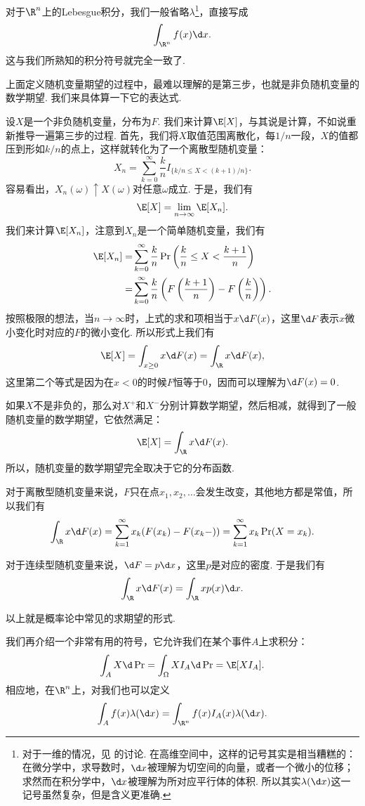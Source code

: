 对于$\R^n$上的Lebesgue积分，我们一般省略$\lambda$\footnote{对于一维的情况，见 的讨论. 在高维空间中，这样的记号其实是相当糟糕的：在微分学中，求导数时，$\d x$被理解为切空间的向量，或者一个微小的位移；求然而在积分学中，$\d x$被理解为所对应平行体的体积. 所以其实$\lambda(\d x)$这一记号虽然复杂，但是含义更准确. }，直接写成
\[\int_{\R^n} f(x)\d x.\]
这与我们所熟知的积分符号就完全一致了. 

上面定义随机变量期望的过程中，最难以理解的是第三步，也就是非负随机变量的数学期望. 我们来具体算一下它的表达式. 

设$X$是一个非负随机变量，分布为$F$. 我们来计算$\E[X]$，与其说是计算，不如说重新推导一遍第三步的过程. 首先，我们将$X$取值范围离散化，每$1/n$一段，$X$的值都压到形如$k/n$的点上，这样就转化为了一个离散型随机变量：
\[X_n=\sum_{k=0}^\infty\frac{k}{n}I_{\{k/n\leq X<(k+1)/n\}}.\]
容易看出，$X_n(\omega)\uparrow X(\omega)$对任意$\omega$成立. 于是，我们有
\[\E[X]=\lim_{n\to\infty}\E[X_n].\]
我们来计算$\E[X_n]$，注意到$X_n$是一个简单随机变量，我们有
\begin{align*}
    \E[X_n]=&\sum_{k=0}^\infty\frac{k}{n}\Pr\left(\frac{k}{n}\leq X<\frac{k+1}{n}\right)\\
    =&\sum_{k=0}^\infty\frac{k}{n}\left(F\left(\frac{k+1}{n}\right)-F\left(\frac{k}{n}\right)\right).
\end{align*}
按照极限的想法，当$n\to\infty$时，上式的求和项相当于$x\d F(x)$，这里$\d F$表示$x$微小变化时对应的$F$的微小变化. 所以形式上我们有
\[\E[X]=\int_{x\geq 0} x\d F(x)=\int_\R x\d F(x),\]
这里第二个等式是因为在$x<0$的时候$F$恒等于$0$，因而可以理解为$\d F(x)=0$.

如果$X$不是非负的，那么对$X^+$和$X^-$分别计算数学期望，然后相减，就得到了一般随机变量的数学期望，它依然满足：
\[\E[X]=\int_{\R} x\d F(x).\]
所以，随机变量的数学期望完全取决于它的分布函数. 

对于离散型随机变量来说，$F$只在点$x_1,x_2,\dots$会发生改变，其他地方都是常值，所以我们有
\[\int_{\R} x\d F(x)=\sum_{k=1}^\infty x_k(F(x_k)-F(x_k-))=\sum_{k=1}^\infty x_k\Pr(X=x_k).\]

对于连续型随机变量来说，$\d F=p\d x$，这里$p$是对应的密度. 于是我们有
\[\int_{\R} x\d F(x)=\int_{\R} x p(x)\d x.\]

以上就是概率论中常见的求期望的形式. 

我们再介绍一个非常有用的符号，它允许我们在某个事件$A$上求积分：
\[\int_A X\d\Pr=\int_{\Omega} XI_A\d\Pr=\E[XI_A].\]
相应地，在$\R^n$上，对我们也可以定义
\[\int_A f(x)\lambda(\d x)=\int_{\R^n} f(x)I_A(x)\lambda(\d x).\]



